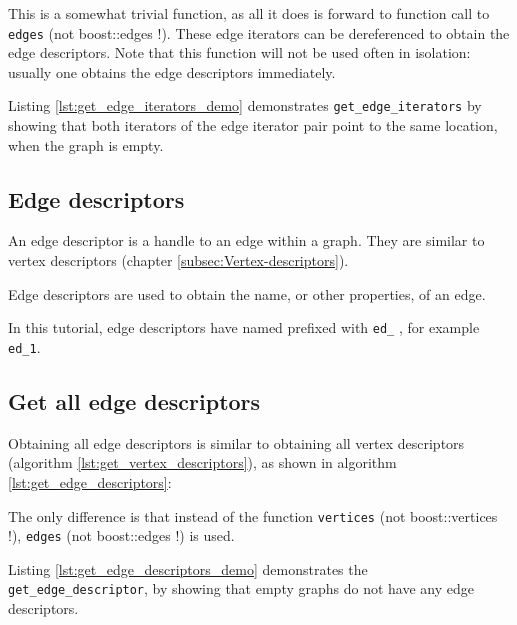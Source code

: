 This is a somewhat trivial function, as all it does is forward to function
call to \verb;edges; 
(not boost::edges !). 
These edge iterators can be dereferenced to obtain the edge descriptors.
Note that this function will not be used often in isolation: usually one
obtains the edge descriptors immediately.

Listing \ref{lst:get_edge_iterators_demo}
demonstrates \verb;get_edge_iterators; by showing that both iterators of the
edge iterator pair point to the same location, when the graph is empty.



\subsection{Edge descriptors}
\label{subsec:Edge-descriptors}

An edge descriptor is a handle to an edge within a graph.
They are similar to vertex descriptors (chapter \ref{subsec:Vertex-descriptors}).

Edge descriptors are used to obtain the name, or other properties, of an edge.

In this tutorial, edge descriptors have named prefixed with \verb;ed_;
, for example \verb;ed_1;.

\subsection{Get all edge descriptors}
\label{subsec:get_edge_descriptors}

Obtaining all edge descriptors is similar to obtaining all vertex descriptors
(algorithm \ref{lst:get_vertex_descriptors}), 
as shown in algorithm \ref{lst:get_edge_descriptors}:



The only difference is that instead of the 
function \verb;vertices; 
(not boost::vertices !), 
\verb;edges;  
(not boost::edges !) is used.

Listing \ref{lst:get_edge_descriptors_demo}
demonstrates the \verb;get_edge_descriptor;, by showing that empty graphs do
not have any edge descriptors.



